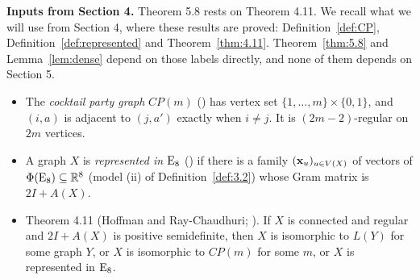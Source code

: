 \begingroup\raggedright
\medskip\noindent\textbf{Inputs from Section 4.}\label{input:sec4}
Theorem 5.8 rests on Theorem 4.11. We recall what we will use from Section 4, where these
results are proved: Definition~\ref{def:CP}, Definition~\ref{def:represented} and
Theorem~\ref{thm:4.11}. Theorem~\ref{thm:5.8} and Lemma~\ref{lem:dense} depend on those labels
directly, and none of them depends on Section 5.
\begin{itemize}
 \item The \emph{cocktail party graph} $CP(m)$ () has vertex set
  $\{1,\dots,m\}\times\{0,1\}$, and $(i,a)$ is adjacent to $(j,a')$ exactly when $i\ne j$. It is
  $(2m-2)$-regular on $2m$ vertices.
 \item A graph $X$ is \emph{represented in $\mathrm{E}_8$} () if
  there is a family $({\mathbf x}_u)_{u\in V(X)}$ of vectors of $\Phi(\mathrm{E}_8)\subseteq{\mathbb R}^8$ (model (ii) of
  Definition~\ref{def:3.2}) whose Gram matrix is $2I+A(X)$.
 \item Theorem 4.11 (Hoffman and Ray-Chaudhuri; ). If
  $X$ is connected and regular and $2I+A(X)$ is positive semidefinite, then $X$ is isomorphic to
  $L(Y)$ for some graph $Y$, or $X$ is isomorphic to $CP(m)$ for some $m$, or $X$ is represented
  in $\mathrm{E}_8$.
\end{itemize}
\endgroup


